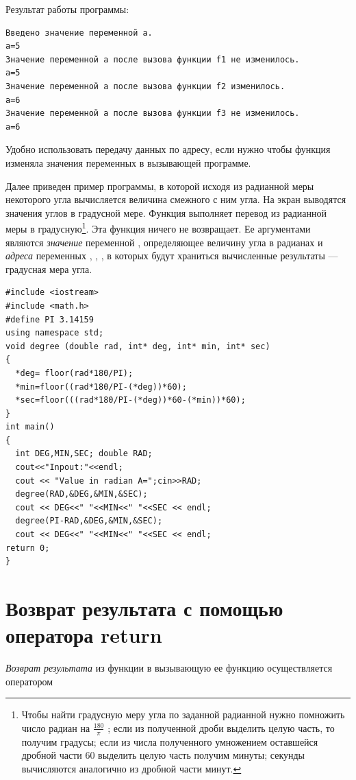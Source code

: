 Результат работы программы:
\begin{verbatim}
Введено значение переменной a.
a=5 
Значение переменной a после вызова функции f1 не изменилось.
a=5 
Значение переменной a после вызова функции f2 изменилось.
a=6 
Значение переменной a после вызова функции f3 не изменилось.
a=6 
\end{verbatim}

Удобно использовать передачу данных по адресу, если нужно чтобы функция изменяла значения переменных в вызывающей
программе.

Далее приведен пример программы, в которой исходя из радианной меры  некоторого угла вычисляется величина смежного с ним
угла. На экран выводятся значения углов в градусной мере. Функция  выполняет перевод из
радианной меры в градусную\footnote{Чтобы найти градусную меру угла по заданной радианной нужно помножить число радиан
на  $\frac{180}{\pi }$ ; если из полученной дроби выделить целую часть, то получим градусы; если из числа полученного
умножением оставшейся дробной части 60 выделить целую часть получим минуты; секунды вычисляются аналогично из дробной
части минут.}. Эта функция ничего не возвращает. Ее аргументами являются \emph{значение} переменной
, определяющее величину угла в радианах и \emph{адреса} переменных
, , , в которых будут храниться вычисленные
результаты --- градусная мера угла. 
\begin{lstlisting}
#include <iostream>
#include <math.h>
#define PI 3.14159
using namespace std;
void degree (double rad, int* deg, int* min, int* sec)
{
  *deg= floor(rad*180/PI);
  *min=floor((rad*180/PI-(*deg))*60);
  *sec=floor(((rad*180/PI-(*deg))*60-(*min))*60);
}
int main()
{
  int DEG,MIN,SEC; double RAD;
  cout<<"Inpout:"<<endl;
  cout << "Value in radian A=";cin>>RAD;
  degree(RAD,&DEG,&MIN,&SEC);
  cout << DEG<<" "<<MIN<<" "<<SEC << endl;
  degree(PI-RAD,&DEG,&MIN,&SEC);
  cout << DEG<<" "<<MIN<<" "<<SEC << endl;
return 0;
}
\end{lstlisting}

\section[Возврат результата с помощью оператора return]{Возврат результата с помощью оператора return}
\emph{Возврат результата} из функции в вызывающую ее функцию
осуществляется оператором


